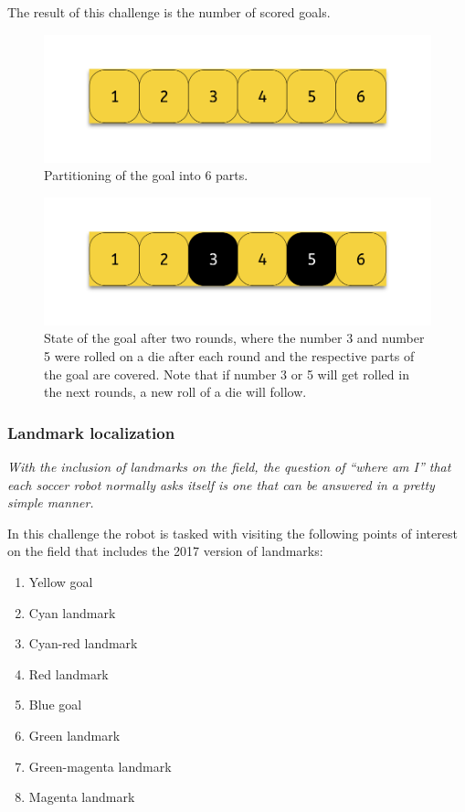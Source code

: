\documentclass{article}
\begin{document}
The result of this challenge is the number of scored goals.

\begin{figure}
  \centering
  \includegraphics[width=.9\linewidth]{media/goal_parts}
  \caption{Partitioning of the goal into 6 parts.}
  \label{fig:goal_parts}
\end{figure}%
\begin{figure}
  \centering
  \includegraphics[width=.9\linewidth]{media/goal_parts_filled}
  \caption{State of the goal after two rounds, where the number 3 and number 5
      were rolled on a die after each round and the respective parts of the
      goal are covered. Note that if number 3 or 5 will get rolled in the next
      rounds, a new roll of a die will follow.}
  \label{fig:goal_parts_filled}
\end{figure}

\subsubsection{Landmark localization}

\textit{With the inclusion of landmarks on the field, the
question of “where am I” that each soccer robot normally asks itself is
one that can be answered in a pretty simple manner.}

In this challenge the robot is tasked with visiting the
    following points of interest on the field that includes the 2017 version of
    landmarks:

\begin{enumerate}
    \item Yellow goal
    \item Cyan landmark
    \item Cyan-red landmark
    \item Red landmark
    \item Blue goal
    \item Green landmark
    \item Green-magenta landmark
    \item Magenta landmark
\end{enumerate}
\end{document}
